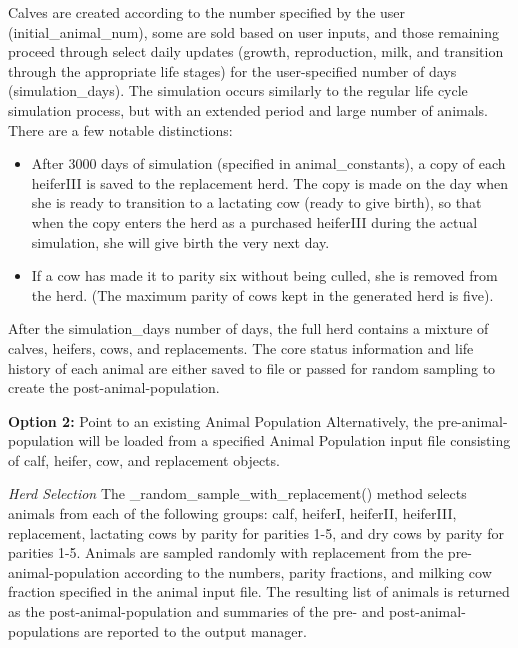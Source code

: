 \begin{refsection}
Calves are created according to the number specified by the user (initial\_animal\_num), some are sold based on user inputs, and those remaining proceed through select daily updates (growth, reproduction, milk, and transition through the appropriate life stages) for the user-specified number of days (simulation\_days). The simulation occurs similarly to the regular life cycle simulation process, but with an extended period and large number of animals. There are a few notable distinctions:  
\begin{itemize}
    \item After 3000 days of simulation (specified in animal\_constants), a copy of each heiferIII is saved to the replacement herd. The copy is made on the day when she is ready to transition to a lactating cow (ready to give birth), so that when the copy enters the herd as a purchased heiferIII during the actual simulation, she will give birth the very next day. 
    \item If a cow has made it to parity six without being culled, she is removed from the herd. (The maximum parity of cows kept in the generated herd is five). 

\end{itemize}

After the simulation\_days number of days, the full herd contains a mixture of calves, heifers, cows, and replacements. The core status information and life history of each animal are either saved to file or passed for random sampling to create the post-animal-population. 
\vspace{0.2cm}

\textbf{Option 2:} Point to an existing Animal Population
Alternatively, the pre-animal-population will be loaded from a specified Animal Population input file consisting of calf, heifer, cow, and replacement objects. 
\vspace{0.2cm}

\textit{Herd Selection}
The \_random\_sample\_with\_replacement() method selects animals from each of the following groups: calf, heiferI, heiferII, heiferIII, replacement, lactating cows by parity for parities 1-5, and dry cows by parity for parities 1-5. Animals are sampled randomly with replacement from the pre-animal-population according to the numbers, parity fractions, and milking cow fraction specified in the animal input file. The resulting list of animals is returned as the post-animal-population and summaries of the pre- and post-animal-populations are reported to the output manager.




\end{refsection}
